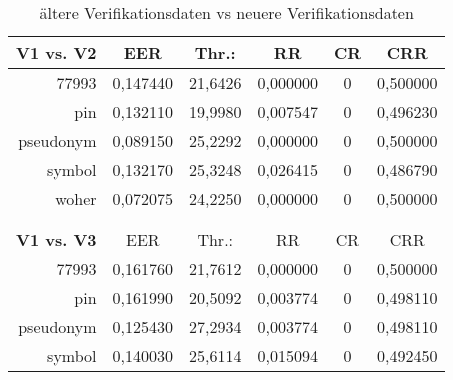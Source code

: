 \begin{table}[htbp]
  \centering
  \caption{\"altere Verifikationsdaten vs neuere Verifikationsdaten}
    \begin{tabular}{rrrrrr}
    \toprule
    \textbf{V1 vs. V2} & \multicolumn{1}{c}{EER} & \multicolumn{1}{c}{Thr.:} & \multicolumn{1}{c}{RR} & \multicolumn{1}{c}{CR} & \multicolumn{1}{c}{CRR} \\
    \midrule
    77993 & \multicolumn{1}{c}{0,147440} & \multicolumn{1}{c}{21,6426} & \multicolumn{1}{c}{0,000000} & \multicolumn{1}{c}{0} & \multicolumn{1}{c}{0,500000} \\
    pin   & \multicolumn{1}{c}{0,132110} & \multicolumn{1}{c}{19,9980} & \multicolumn{1}{c}{0,007547} & \multicolumn{1}{c}{0} & \multicolumn{1}{c}{0,496230} \\
    pseudonym & \multicolumn{1}{c}{0,089150} & \multicolumn{1}{c}{25,2292} & \multicolumn{1}{c}{0,000000} & \multicolumn{1}{c}{0} & \multicolumn{1}{c}{0,500000} \\
    symbol & \multicolumn{1}{c}{0,132170} & \multicolumn{1}{c}{25,3248} & \multicolumn{1}{c}{0,026415} & \multicolumn{1}{c}{0} & \multicolumn{1}{c}{0,486790} \\
    woher & \multicolumn{1}{c}{0,072075} & \multicolumn{1}{c}{24,2250} & \multicolumn{1}{c}{0,000000} & \multicolumn{1}{c}{0} & \multicolumn{1}{c}{0,500000} \\
          &       &       &       &       &  \\
          &       &       &       &       &  \\
    \textbf{V1 vs. V3} & \multicolumn{1}{c}{EER} & \multicolumn{1}{c}{Thr.:} & \multicolumn{1}{c}{RR} & \multicolumn{1}{c}{CR} & \multicolumn{1}{c}{CRR} \\
    77993 & \multicolumn{1}{c}{0,161760} & \multicolumn{1}{c}{21,7612} & \multicolumn{1}{c}{0,000000} & \multicolumn{1}{c}{0} & \multicolumn{1}{c}{0,500000} \\
    pin   & \multicolumn{1}{c}{0,161990} & \multicolumn{1}{c}{20,5092} & \multicolumn{1}{c}{0,003774} & \multicolumn{1}{c}{0} & \multicolumn{1}{c}{0,498110} \\
    pseudonym & \multicolumn{1}{c}{0,125430} & \multicolumn{1}{c}{27,2934} & \multicolumn{1}{c}{0,003774} & \multicolumn{1}{c}{0} & \multicolumn{1}{c}{0,498110} \\
    symbol & \multicolumn{1}{c}{0,140030} & \multicolumn{1}{c}{25,6114} & \multicolumn{1}{c}{0,015094} & \multicolumn{1}{c}{0} & \multicolumn{1}{c}{0,492450} \\

\end{tabular}
\end{table}
